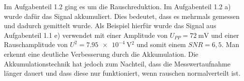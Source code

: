 \documentclass{article}						%
\begin{document}
		Im Aufgabenteil 1.2 ging es um die Rauschreduktion. Im Aufgabenteil 1.2 a) wurde dafür das Signal akkumuliert. Dies bedeutet, dass es mehrmals gemessen und dadurch gemittelt wurde. Als Beispiel hierfür wurde das Signal aus Aufgabenteil 1.1 e) verwendet mit einer Amplitude von $ U_{PP} = \SI{72}{\milli\volt} $ und einer Rauschamplitude von $ U^2 = \SI{7,95e-4}{\volt^2} $ und somit einem $ SNR = 6,5 $. Man erkennt eine deutliche Verbesserung durch die Akkumulation. Die Akkumulationstechnik hat jedoch zum Nachteil, dass die Messwertaufnahme länger dauert und dass diese nur funktioniert, wenn rauschen normalverteilt ist. 
		\begin{figure}[h!]
		\end{figure}
		
\end{document}
